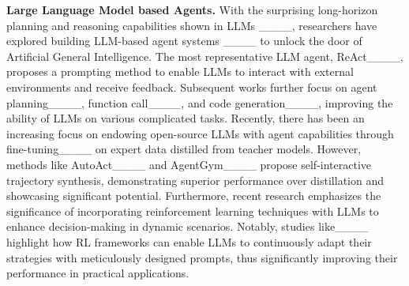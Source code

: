 \noindent\textbf{Large Language Model based Agents.}
With the surprising long-horizon planning and reasoning capabilities shown in LLMs ____, researchers have explored building LLM-based agent systems ____ to unlock the door of Artificial General Intelligence. The most representative LLM agent, ReAct____, proposes a prompting method to enable LLMs to interact with external environments and receive feedback. Subsequent works further focus on agent planning____, function call____, and code generation____, improving the ability of LLMs on various complicated tasks. Recently, there has been an increasing focus on endowing open-source LLMs with agent capabilities through fine-tuning____ on expert data distilled from teacher models. However, methods like AutoAct____ and AgentGym____ propose self-interactive trajectory synthesis, demonstrating superior performance over distillation and showcasing significant potential. Furthermore, recent research emphasizes the significance of incorporating reinforcement learning techniques with LLMs to enhance decision-making in dynamic scenarios. Notably, studies like____ highlight how RL frameworks can enable LLMs to continuously adapt their strategies with meticulously designed prompts, thus significantly improving their performance in practical applications. 







